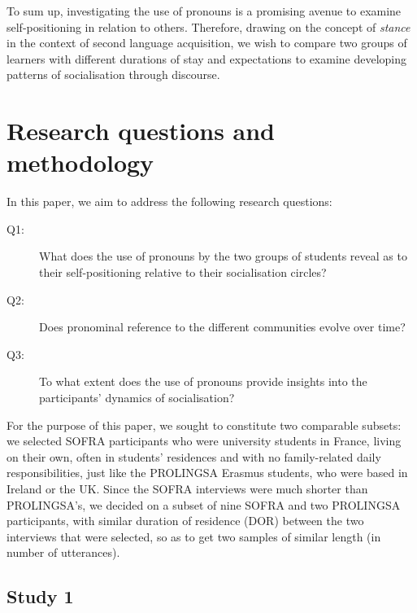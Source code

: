 \documentclass[output=paper]{langscibook}
\begin{document}
To sum up, investigating the use of pronouns is a promising avenue to examine self-positioning in relation to others. Therefore, drawing on the concept of \textit{stance} in the context of second language acquisition, we wish to compare two groups of learners with different durations of stay and expectations to examine developing patterns of socialisation through discourse.

\section{Research questions and methodology}\label{sec:saddour:2}\largerpage

In this paper, we aim to address the following research questions:

\begin{description}
 \item[Q1:] What does the use of pronouns by the two groups of students reveal as to their self-positioning relative to their socialisation circles?
 \item[Q2:] Does pronominal reference to the different communities evolve over time?
 \item[Q3:] To what extent does the use of pronouns provide insights into the participants’ dynamics of socialisation?
\end{description}


For the purpose of this paper, we sought to constitute two comparable subsets: we selected SOFRA participants who were university students in France, living on their own, often in students’ residences and with no family-related daily responsibilities, just like the PROLINGSA Erasmus students, who were based in Ireland or the UK. Since the SOFRA interviews were much shorter than PROLINGSA’s, we decided on a subset of nine SOFRA and two PROLINGSA participants, with similar duration of residence (DOR) between the two interviews that were selected, so as to get two samples of similar length (in number of utterances).

\subsection{Study 1}\label{sec:saddour:2.1}
\end{document}

